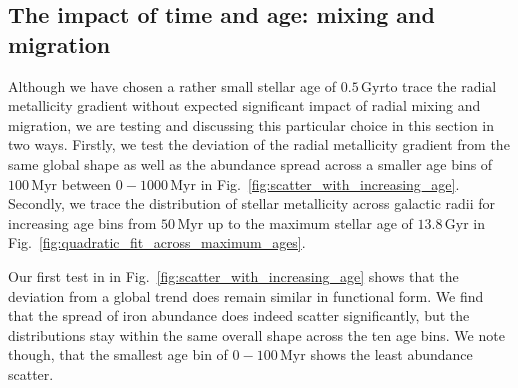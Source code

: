 \documentclass[fleqn,usenatbib]{mnras}
\newcommand{\nihaoAGEmax}{$0.5\,\mathrm{Gyr}$}
\begin{document}
\subsection{The impact of time and age: mixing and migration} \label{sec:discussion_time}

Although we have chosen a rather small stellar age of \nihaoAGEmax to trace the radial metallicity gradient without expected significant impact of radial mixing and migration, we are testing and discussing this particular choice in this section in two ways. Firstly, we test the deviation of the radial metallicity gradient from the same global shape as well as the abundance spread across a smaller age bins of $100\,\mathrm{Myr}$ between $0-1000\,\mathrm{Myr}$ in Fig.~\ref{fig:scatter_with_increasing_age}. Secondly, we trace the distribution of stellar metallicity across galactic radii for increasing age bins from $50\,\mathrm{Myr}$ up to the maximum stellar age of $13.8\,\mathrm{Gyr}$ in Fig.~\ref{fig:quadratic_fit_across_maximum_ages}.

Our first test in in Fig.~\ref{fig:scatter_with_increasing_age} shows that the deviation from a global trend does remain similar in functional form. We find that the spread of iron abundance does indeed scatter significantly, but the distributions stay within the same overall shape across the ten age bins. We note though, that the smallest age bin of $0-100\,\mathrm{Myr}$ shows the least abundance scatter.
\end{document}
